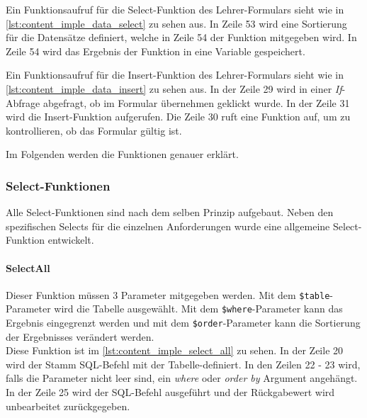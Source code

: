 Ein Funktionsaufruf für die Select-Funktion des Lehrer-Formulars sieht wie in \autoref{lst:content_imple_data_select} zu sehen aus. In Zeile 53 wird eine Sortierung für die Datensätze definiert, welche in Zeile 54 der Funktion mitgegeben wird. In Zeile 54 wird das Ergebnis der Funktion in eine Variable gespeichert.



Ein Funktionsaufruf für die Insert-Funktion des Lehrer-Formulars sieht wie in \autoref{lst:content_imple_data_insert} zu sehen aus. In der Zeile 29 wird in einer \textit{If}-Abfrage abgefragt, ob im Formular übernehmen geklickt wurde. In der Zeile 31 wird die Insert-Funktion aufgerufen. Die Zeile 30 ruft eine Funktion auf, um zu kontrollieren, ob das Formular gültig ist.



Im Folgenden werden die Funktionen genauer erklärt.

\subsubsection{Select-Funktionen}
Alle Select-Funktionen sind nach dem selben Prinzip aufgebaut. Neben den spezifischen Selects für die einzelnen Anforderungen wurde eine allgemeine Select-Funktion entwickelt.
\paragraph{SelectAll\\}
Dieser Funktion müssen 3 Parameter mitgegeben werden. Mit dem \texttt{\$table}-Parameter wird die Tabelle ausgewählt. Mit dem \texttt{\$where}-Parameter kann das Ergebnis eingegrenzt werden und mit dem \texttt{\$order}-Parameter kann die Sortierung der Ergebnisses verändert werden.\\
Diese Funktion ist im \autoref{lst:content_imple_select_all} zu sehen. In der Zeile 20 wird der Stamm SQL-Befehl mit der Tabelle-definiert. In den Zeilen 22 - 23 wird, falls die Parameter nicht leer sind, ein \textit{where} oder \textit{order by} Argument angehängt. In der Zeile 25 wird der SQL-Befehl ausgeführt und der Rückgabewert wird unbearbeitet zurückgegeben.

